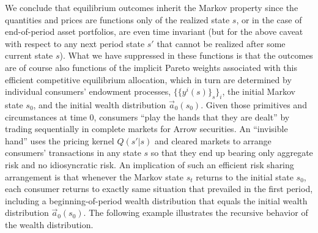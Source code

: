  
We conclude that equilibrium outcomes 
inherit the Markov property since the 
quantities and prices are functions only of 
the realized state $s$, or in the case of 
end-of-period asset portfolios, are even 
time invariant (but for the above caveat with 
respect to any next period state $s'$ that 
cannot be realized after some current 
state $s$).
What we have suppressed in these functions is 
that the outcomes are of course also functions 
of the implicit Pareto weights associated
with this efficient competitive equilibrium 
allocation, which in turn are determined by 
individual consumers' endowment processes, 
$\{\{y^i(s)\}_s\}_i$, the initial Markov 
state $s_0$, and the initial wealth distribution
$\vec { a}_0(s_0)$. Given those primitives 
and circumstances at time 0, 
consumers ``play the hands that they are dealt'' 
by trading sequentially in complete markets for 
Arrow securities. An ``invisible hand''
uses the pricing kernel $Q(s'|s)$ and cleared 
markets to arrange consumers' transactions 
in any state $s$ so that they end up bearing   only aggregate risk
and 
no idiosyncratic risk.
An implication of such an efficient risk sharing
arrangement is that whenever the Markov state $s_t$ 
returns to the initial state $s_0$, each consumer 
returns  to exactly same situation that 
prevailed in the first period, including a
beginning-of-period wealth distribution that  equals 
the initial wealth distribution
$\vec {a}_0(s_0)$. The following example
illustrates the recursive behavior of the wealth
distribution.




